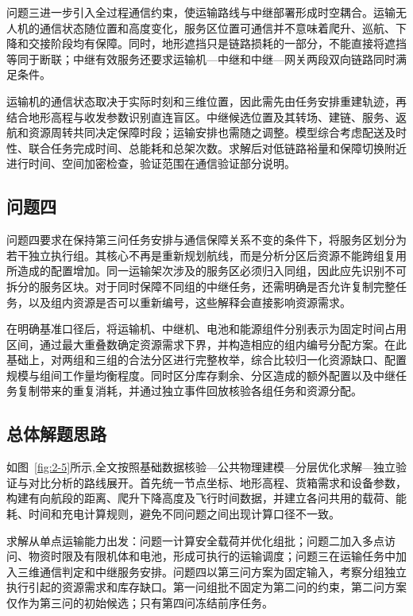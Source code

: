 \documentclass[bwprint]{gmcmthesis}
\begin{document}
问题三进一步引入全过程通信约束，使运输路线与中继部署形成时空耦合。运输无人机的通信状态随位置和高度变化，服务区位置可通信并不意味着爬升、巡航、下降和交接阶段均有保障。同时，地形遮挡只是链路损耗的一部分，不能直接将遮挡等同于断联；中继有效服务还要求运输机—中继和中继—网关两段双向链路同时满足条件。

运输机的通信状态取决于实际时刻和三维位置，因此需先由任务安排重建轨迹，再结合地形高程与收发参数识别直连盲区。中继候选位置及其转场、建链、服务、返航和资源周转共同决定保障时段；运输安排也需随之调整。模型综合考虑配送及时性、联合任务完成时间、总能耗和总架次数。求解后对低链路裕量和保障切换附近进行时间、空间加密检查，验证范围在通信验证部分说明。

\subsection{问题四}

问题四要求在保持第三问任务安排与通信保障关系不变的条件下，将服务区划分为若干独立执行组。其核心不再是重新规划航线，而是分析分区后资源不能跨组复用所造成的配置增加。同一运输架次涉及的服务区必须归入同组，因此应先识别不可拆分的服务区块。对于同时保障不同组的中继任务，还需明确是否允许复制完整任务，以及组内资源是否可以重新编号，这些解释会直接影响资源需求。

在明确基准口径后，将运输机、中继机、电池和能源组件分别表示为固定时间占用区间，通过最大重叠数确定资源需求下界，并构造相应的组内编号分配方案。在此基础上，对两组和三组的合法分区进行完整枚举，综合比较归一化资源缺口、配置规模与组间工作量均衡程度。同时区分库存剩余、分区造成的额外配置以及中继任务复制带来的重复消耗，并通过独立事件回放核验各组任务和资源分配。

\subsection{总体解题思路}

如图~\ref{fig:2-5}所示,全文按照基础数据核验—公共物理建模—分层优化求解—独立验证与对比分析的路线展开。首先统一节点坐标、地形高程、货箱需求和设备参数，构建有向航段的距离、爬升下降高度及飞行时间数据，并建立各问共用的载荷、能耗、时间和充电计算规则，避免不同问题之间出现计算口径不一致。

求解从单点运输能力出发：问题一计算安全载荷并优化组批；问题二加入多点访问、物资时限及有限机体和电池，形成可执行的运输调度；问题三在运输任务中加入三维通信判定和中继服务安排。问题四以第三问方案为固定输入，考察分组独立执行引起的资源需求和库存缺口。第一问组批不固定为第二问的约束，第二问方案仅作为第三问的初始候选；只有第四问冻结前序任务。
\end{document}
